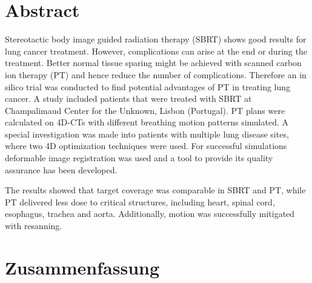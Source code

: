 \section*{Abstract}


Stereotactic body image guided radiation therapy (SBRT) shows good results for lung cancer treatment. 
However, complications can arise at the end or during the treatment. 
Better normal tissue sparing might be achieved with scanned carbon ion therapy (PT) and hence reduce the number of complications. 
Therefore an in silico trial was conducted to find potential advantages of PT in treating lung cancer. 
A study included patients that were treated with SBRT at Champalimaud Center for the Unknown, Lisbon (Portugal). 
PT plans were calculated on 4D-CTs with different breathing motion patterns simulated. A special investigation was made into patients with multiple lung disease sites, 
where two 4D optimization techniques were used. For successful simulations
deformable image registration was used and a tool to provide its quality assurance has been developed.

The results showed that target coverage was comparable in SBRT and PT, while PT delivered less dose to critical structures, including heart, spinal cord, esophagus, trachea and aorta. 
Additionally, motion was successfully mitigated with resanning. 



\section*{Zusammenfassung}

